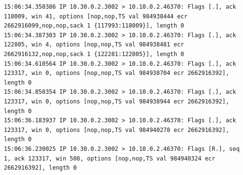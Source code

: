 \documentclass[a4paper,12pt]{article}
\begin{document}
\begin{Verbatim}
15:06:34.350386 IP 10.30.0.2.3002 > 10.10.0.2.46370: Flags [.], ack 118009, win 41, options [nop,nop,TS val 984938444 ecr 2662916099,nop,nop,sack 1 {117993:118009}], length 0
15:06:34.387303 IP 10.30.0.2.3002 > 10.10.0.2.46370: Flags [.], ack 122805, win 4, options [nop,nop,TS val 984938481 ecr 2662916132,nop,nop,sack 1 {122281:122805}], length 0
15:06:34.610564 IP 10.30.0.2.3002 > 10.10.0.2.46370: Flags [.], ack 123317, win 0, options [nop,nop,TS val 984938704 ecr 2662916392], length 0
15:06:34.850354 IP 10.30.0.2.3002 > 10.10.0.2.46370: Flags [.], ack 123317, win 0, options [nop,nop,TS val 984938944 ecr 2662916392], length 0
15:06:36.183937 IP 10.30.0.2.3002 > 10.10.0.2.46370: Flags [.], ack 123317, win 0, options [nop,nop,TS val 984940278 ecr 2662916392], length 0
15:06:36.230025 IP 10.30.0.2.3002 > 10.10.0.2.46370: Flags [R.], seq 1, ack 123317, win 508, options [nop,nop,TS val 984940324 ecr 2662916392], length 0
\end{Verbatim}
\end{document}
